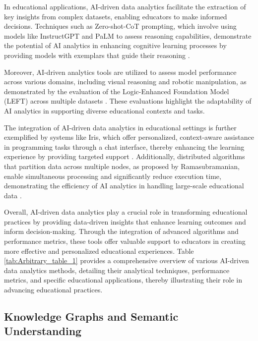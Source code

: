 In educational applications, AI-driven data analytics facilitate the extraction of key insights from complex datasets, enabling educators to make informed decisions. Techniques such as Zero-shot-CoT prompting, which involve using models like InstructGPT and PaLM to assess reasoning capabilities, demonstrate the potential of AI analytics in enhancing cognitive learning processes by providing models with exemplars that guide their reasoning \cite{kojima2022large}.

Moreover, AI-driven analytics tools are utilized to assess model performance across various domains, including visual reasoning and robotic manipulation, as demonstrated by the evaluation of the Logic-Enhanced Foundation Model (LEFT) across multiple datasets \cite{hsu2023whatsleftconceptgrounding}. These evaluations highlight the adaptability of AI analytics in supporting diverse educational contexts and tasks.

The integration of AI-driven data analytics in educational settings is further exemplified by systems like Iris, which offer personalized, context-aware assistance in programming tasks through a chat interface, thereby enhancing the learning experience by providing targeted support \cite{bassner2024irisaidrivenvirtualtutor}. Additionally, distributed algorithms that partition data across multiple nodes, as proposed by Ramasubramanian, enable simultaneous processing and significantly reduce execution time, demonstrating the efficiency of AI analytics in handling large-scale educational data \cite{ramasubramanian2009teachingresultanalysisusing}.

Overall, AI-driven data analytics play a crucial role in transforming educational practices by providing data-driven insights that enhance learning outcomes and inform decision-making. Through the integration of advanced algorithms and performance metrics, these tools offer valuable support to educators in creating more effective and personalized educational experiences. Table \ref{tab:Arbitrary_table_1} provides a comprehensive overview of various AI-driven data analytics methods, detailing their analytical techniques, performance metrics, and specific educational applications, thereby illustrating their role in advancing educational practices.




\subsection{Knowledge Graphs and Semantic Understanding} \label{subsec:Knowledge Graphs and Semantic Understanding}

